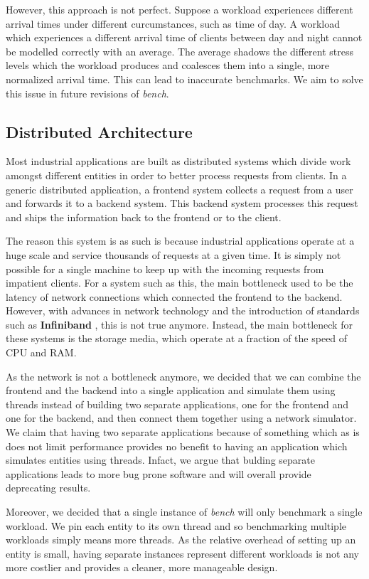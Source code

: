 \documentclass[10pt, author, twocolumn]{article}
\begin{document}
However, this approach is not perfect. Suppose a workload experiences different arrival times under different curcumstances, such as time of day. A workload which experiences a different arrival time of clients between day and night cannot be modelled correctly with an average. The average shadows the different stress levels which the workload produces and coalesces them into a single, more normalized arrival time. This can lead to inaccurate benchmarks. We aim to solve this issue in future revisions of \textit{bench}.

\subsection{Distributed Architecture}
Most industrial applications are built as distributed systems which divide work amongst different entities in order to better process requests from clients. In a generic distributed application, a frontend system collects a request from a user and forwards it to a backend system. This backend system processes this request and ships the information back to the frontend or to the client. 

The reason this system is as such is because industrial applications operate at a huge scale and service thousands of requests at a given time. It is simply not possible for a single machine to keep up with the incoming requests from impatient clients. For a system such as this, the main bottleneck used to be the latency of network connections which connected the frontend to the backend. However, with advances in network technology and the introduction of standards such as \textbf{Infiniband} \cite{pfister2001introduction}, this is not true anymore. Instead, the main bottleneck for these systems is the storage media, which operate at a fraction of the speed of CPU and RAM. 

As the network is not a bottleneck anymore, we decided that we can combine the frontend and the backend into a single application and simulate them using threads instead of building two separate applications, one for the frontend and one for the backend, and then connect them together using a network simulator. We claim that having two separate applications because of something which as is does not limit performance provides no benefit to having an application which simulates entities using threads. Infact, we argue that bulding separate applications leads to more bug prone software and will overall provide deprecating results. 

Moreover, we decided that a single instance of \textit{bench} will only benchmark a single workload. We pin each entity to its own thread and so benchmarking multiple workloads simply means more threads. As the relative overhead of setting up an entity is small, having separate instances represent different workloads is not any more costlier and provides a cleaner, more manageable design. 
\end{document}
